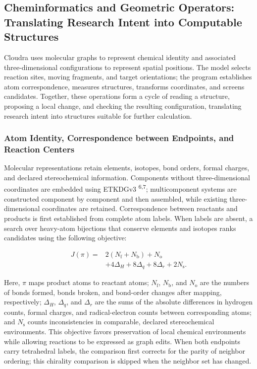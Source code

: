 \subsection{Cheminformatics and Geometric Operators: Translating Research Intent into Computable Structures}

Cloudra uses molecular graphs to represent chemical identity and associated three-dimensional configurations to represent spatial positions. The model selects reaction sites, moving fragments, and target orientations; the program establishes atom correspondence, measures structures, transforms coordinates, and screens candidates. Together, these operations form a cycle of reading a structure, proposing a local change, and checking the resulting configuration, translating research intent into structures suitable for further calculation.

\subsubsection{Atom Identity, Correspondence between Endpoints, and Reaction Centers}

Molecular representations retain elements, isotopes, bond orders, formal charges, and declared stereochemical information. Components without three-dimensional coordinates are embedded using ETKDGv3 \textsuperscript{6,7}; multicomponent systems are constructed component by component and then assembled, while existing three-dimensional coordinates are retained. Correspondence between reactants and products is first established from complete atom labels. When labels are absent, a search over heavy-atom bijections that conserve elements and isotopes ranks candidates using the following objective:

\begin{equation}\label{eq:methods-1}
\begin{aligned}
J(\pi)={}&2(N_{\mathrm f}+N_{\mathrm b})+N_{\mathrm o}\\
&+4\Delta_H+8\Delta_q+8\Delta_r+2N_{\mathrm s}.
\end{aligned}
\end{equation}

Here, $\pi$ maps product atoms to reactant atoms; $N_{\mathrm f}$, $N_{\mathrm b}$, and $N_{\mathrm o}$ are the numbers of bonds formed, bonds broken, and bond-order changes after mapping, respectively; $\Delta_H$, $\Delta_q$, and $\Delta_r$ are the sums of the absolute differences in hydrogen counts, formal charges, and radical-electron counts between corresponding atoms; and $N_{\mathrm s}$ counts inconsistencies in comparable, declared stereochemical environments. This objective favors preservation of local chemical environments while allowing reactions to be expressed as graph edits. When both endpoints carry tetrahedral labels, the comparison first corrects for the parity of neighbor ordering; this chirality comparison is skipped when the neighbor set has changed.

